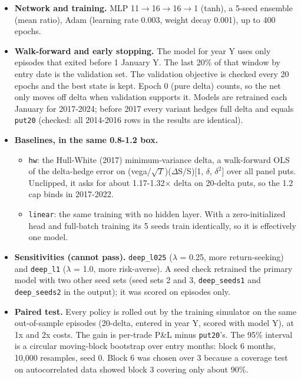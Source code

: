 \documentclass{article}
\begin{document}
\begin{itemize}
\item \textbf{Network and training.} MLP 11\ensuremath{\to}16\ensuremath{\to}16\ensuremath{\to}1 (tanh), a 5-seed ensemble (mean ratio), Adam (learning rate 0.003, weight decay 0.001), up to 400 epochs.

\item \textbf{Walk-forward and early stopping.} The model for year Y uses only episodes that exited before 1 January Y. The last 20\% of that window by entry date is the validation set. The validation objective is checked every 20 epochs and the best state is kept. Epoch 0 (pure delta) counts, so the net only moves off delta when validation supports it. Models are retrained each January for 2017-2024; before 2017 every variant hedges full delta and equals \texttt{put20} (checked: all 2014-2016 rows in the results are identical).

\item \textbf{Baselines, in the same 0.8-1.2 box.}

\begin{itemize}

\item \texttt{hw}: the Hull-White (2017) minimum-variance delta, a walk-forward OLS of the delta-hedge error on (vega/\ensuremath{\sqrt{T}})(\ensuremath{\Delta}S/S)[1, \ensuremath{\delta}, \ensuremath{\delta^2}] over all panel puts. Unclipped, it asks for about 1.17-1.32\ensuremath{\times} delta on 20-delta puts, so the 1.2 cap binds in 2017-2022.

\item \texttt{linear}: the same training with no hidden layer. With a zero-initialized head and full-batch training its 5 seeds train identically, so it is effectively one model.

\end{itemize}

\item \textbf{Sensitivities (cannot pass).} \texttt{deep\_\allowbreak{}l025} (\ensuremath{\lambda} = 0.25, more return-seeking) and \texttt{deep\_\allowbreak{}l1} (\ensuremath{\lambda} = 1.0, more risk-averse). A seed check retrained the primary model with two other seed sets (seed sets 2 and 3, \texttt{deep\_\allowbreak{}seeds1} and \texttt{deep\_\allowbreak{}seeds2} in the output); it was scored on episodes only.

\item \textbf{Paired test.} Every policy is rolled out by the training simulator on the same out-of-sample episodes (20-delta, entered in year Y, scored with model Y), at 1x and 2x costs. The gain is per-trade P\&L minus \texttt{put20}'s. The 95\% interval is a circular moving-block bootstrap over entry months: block 6 months, 10,000 resamples, seed 0. Block 6 was chosen over 3 because a coverage test on autocorrelated data showed block 3 covering only about 90\%.


\end{itemize}
\end{document}
